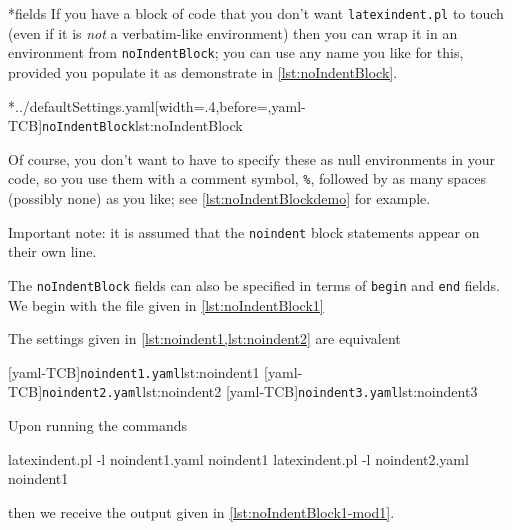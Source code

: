 *{fields}
	If you have a block of code that you don't want \texttt{latexindent.pl} to touch (even if
	 it is \emph{not} a verbatim-like environment) then
	you can wrap it in an environment from \texttt{noIndentBlock}; you can use any name you
	like for this, provided you populate it as demonstrate in \cref{lst:noIndentBlock}.

	\cmhlistingsfromfile[style=noIndentBlock]*{../defaultSettings.yaml}[width=.4\linewidth,before=\centering,yaml-TCB]{\texttt{noIndentBlock}}{lst:noIndentBlock}

	Of course, you don't want to have to specify these as null environments in your code, so
	you use them with a comment symbol, \lstinline!%!, followed by as many spaces
	(possibly none) as you like; see \cref{lst:noIndentBlockdemo} for example.


	Important note: it is assumed that the \texttt{noindent} block statements appear on
	their own line.

	The%
	 \texttt{noIndentBlock} fields can also be specified in terms
	of \texttt{begin} and \texttt{end} fields. We begin with the file
	given in \cref{lst:noIndentBlock1}


	The settings given in \cref{lst:noindent1,lst:noindent2} are equivalent

	\begin{cmhtcbraster}[raster columns=3,
			raster left skip=-3.5cm,
			raster right skip=-2cm,
			raster column skip=.03\linewidth]
		[yaml-TCB]{\texttt{noindent1.yaml}}{lst:noindent1}
		[yaml-TCB]{\texttt{noindent2.yaml}}{lst:noindent2}
		[yaml-TCB]{\texttt{noindent3.yaml}}{lst:noindent3}
	\end{cmhtcbraster}

	Upon running the commands
	\begin{commandshell}
latexindent.pl -l noindent1.yaml noindent1
latexindent.pl -l noindent2.yaml noindent1
\end{commandshell}
	then we receive the output given in \cref{lst:noIndentBlock1-mod1}.

